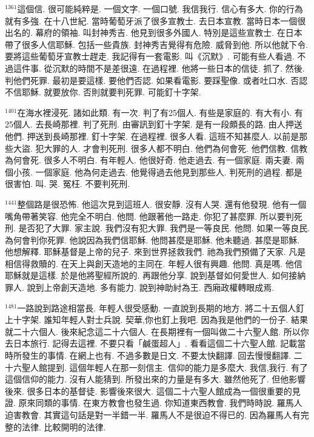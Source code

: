 \documentclass{book}
\begin{document}
$^{1361}$這個信.
很可能純粹是.
一個文字.
一個口號.
我信我行.
信心有多大.
你的行為就有多強.
在十八世紀.
當時葡萄牙派了很多宣教士.
去日本宣教.
當時日本一個很出名的.
幕府的領袖.
叫封神秀吉.
他見到很多外國人.
特別是這些宣教士.
在日本帶了很多人信耶穌.
包括一些貴族.
封神秀吉覺得有危險.
威脅到他.
所以他就下令.
要將這些葡萄牙宣教士趕走.
我記得有一套電影.
叫《沉默》.
可能有些人看過.
不過這件事.
從沉默的時間不是差很遠.
在過程裡.
他將一些日本的信徒.
抓了.
然後.
判他們死罪.
最初是要這樣.
要他們否認.
如果看電影.
要踩聖像.
或者吐口水.
否認不信耶穌.
就要放你.
否則就要判死罪.
可能釘十字架.

$^{1401}$在海水裡浸死.
諸如此類.
有一次.
判了有25個人.
有些是家庭的.
有大有小.
有25個人.
去長崎那裡.
判了死刑.
由審訊到釘十字架.
是有一段頗長的路.
由人押送他們.
押送到長崎那裡.
釘十字架.
在過程裡.
很多人看.
這班不知甚麼人.
以前是那些大盜.
犯大罪的人.
才會判死刑.
很多人都不明白.
他們為何會死.
他們信教.
信教為何會死.
很多人不明白.
有年輕人.
他很好奇.
他走過去.
有一個家庭.
兩夫妻.
兩個小孩.
一個家庭.
他為何走過去.
他覺得過去他見到那些人.
判死刑的過程.
都是很害怕.
叫.
哭.
冤枉.
不要判死刑.

$^{1441}$整個路是很恐怖.
他這次見到這班人.
很安靜.
沒有人哭.
還有他發現.
他有一個嘴角帶著笑容.
他完全不明白.
他問.
他跟著他一路走.
你犯了甚麼罪.
所以要判死刑.
是否犯了大罪.
家主說.
我們沒有犯大罪.
我們是一等良民.
他問.
如果一等良民.
為何會判你死罪.
他說因為我們信耶穌.
他問甚麼是耶穌.
他未聽過.
甚麼是耶穌.
他想解釋.
耶穌基督是上帝的兒子.
來到世界拯救我們.
祂為我們預備了天家.
凡是相信得救贖的.
在天上與創天造地的主同在.
年輕人很有興趣.
他問.
真是嗎.
他信耶穌就是這樣.
於是他將聖經所說的.
再跟他分享.
說到基督如何愛世人.
如何接納罪人.
說到上帝創天造地.
多有能力.
說到神助紂為王.
西廂政權轉眼成焉.

$^{1481}$一路說到路途相當長.
年輕人很受感動.
一直說到長期的地方.
將二十五個人釘上十字架.
誰知年輕人對士兵說.
契華,你也釘上我吧.
因為我是他們的一份子.
結果就二十六個人.
後來紀念這二十六個人.
在長期裡有一個叫做二十六聖人館.
所以你去日本旅行.
記得去這裡.
不要只看「鹹蛋超人」.
看看這個二十六聖人館.
記載當時所發生的事情.
在網上也有.
不過多數是日文.
不要太快翻譯.
回去慢慢翻譯.
二十六聖人館提到.
這個年輕人在那一刻信主.
信仰的能力是多麼大.
我信,我行.
有了這個信仰的能力.
沒有人能猜到.
所發出來的力量是有多大.
雖然他死了.
但他影響後來.
很多日本的基督徒.
影響後來很大.
這個二十六聖人館成為一個很重要的見證.
原來同類的事情.
在東方教會也發生過.
你知道東西教會.
我們時時說.
羅馬人迫害教會.
其實這句話是對一半錯一半.
羅馬人不是很迫不得已的.
因為羅馬人有完整的法律.
比較開明的法律.
\end{document}
